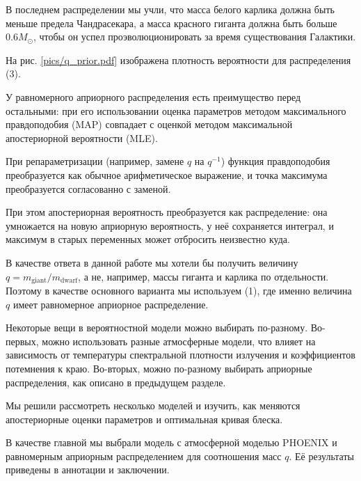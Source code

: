 В последнем распределении мы учли, что масса белого карлика должна быть меньше предела Чандрасекара, а масса красного гиганта должна быть больше $0.6 M_\odot$, чтобы он успел проэволюционировать за время существования Галактики.

На рис. \ref{pics/q_prior.pdf} изображена плотность вероятности для распределения (3).

\vspace{0.5em}


У равномерного априорного распределения есть преимущество перед остальными: при его использовании оценка параметров методом максимального правдоподобия (MAP) совпадает с оценкой методом максимальной апостериорной вероятности (MLE).

При репараметризации (например, замене $q$ на $q^{-1}$) функция правдоподобия преобразуется как обычное арифметическое выражение, и точка максимума преобразуется согласованно с заменой.

При этом апостериорная вероятность преобразуется как распределение: она умножается на новую априорную вероятность, у неё сохраняется интеграл, и максимум в старых переменных может отбросить неизвестно куда.

В качестве ответа в данной работе мы хотели бы получить величину $q = m_\text{giant} / m_\text{dwarf}$, а не, например, массы гиганта и карлика по отдельности. Поэтому в качестве основного варианта мы используем (1), где именно величина $q$ имеет равномерное априорное распределение.



\label{sect:Models}

Некоторые вещи в вероятностной модели можно выбирать по-разному. Во-первых, можно использовать разные атмосферные модели, что влияет на зависимость от температуры спектральной плотности излучения и коэффициентов потемнения к краю. Во-вторых, можно по-разному выбирать априорные распределения, как описано в предыдущем разделе.

Мы решили рассмотреть несколько моделей и изучить, как меняются апостериорные оценки параметров и оптимальная кривая блеска.

В качестве главной мы выбрали модель с атмосферной моделью PHO\-E\-NIX и равномерным априорным распределением для соотношения масс $q$. Её результаты приведены в аннотации и заключении.

